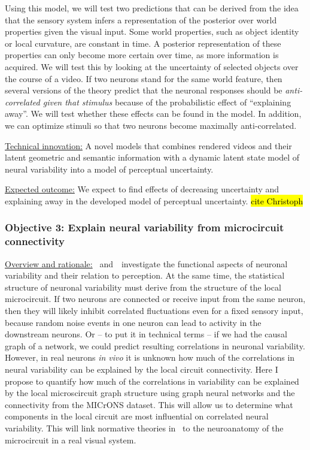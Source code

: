 \documentclass[COG,11pt]{ercgrant}
\begin{document}
Using this model, we will test two predictions that can be derived from the idea that the sensory system infers a representation of the posterior over world properties given the visual input.  Some world properties, such as object identity or local curvature, are constant in time. A posterior representation of these properties can only become more certain over time, as more information is acquired. We will test this by looking at the uncertainty of selected objects over the course of a video.  If two neurons stand for the same world feature, then several versions of the theory predict that the neuronal responses should be \textit{anti-correlated given that stimulus} because of the probabilistic effect of ``explaining away''. We will test whether these effects can be found in the model. In addition, we can optimize stimuli so that two neurons become maximally anti-correlated. 

\underline{Technical innovation:} A novel models that combines rendered videos and their latent geometric and semantic information with a dynamic latent state model of neural variability into a model of perceptual uncertainty.

\underline{Expected outcome:} We expect to find effects of decreasing uncertainty and explaining away in the developed model of perceptual uncertainty. \hl{cite Christoph}

\subsubsection{\colorbox{objiii}{\color{white}Objective 3}: Explain neural variability from microcircuit connectivity}
\label{sub:objiii}
\underline{Overview and rationale:} 
\obji~and~\objii~investigate the functional aspects of neuronal variability and their relation to perception. At the same time, the statistical structure of neuronal variability must derive from the structure of the local microcircuit. If two neurons are connected or receive input from the same neuron, then they will likely inhibit correlated fluctuations even for a fixed sensory input, because random noise events in one neuron can lead to activity in the downstream neurons. Or -- to put it in technical terms -- if we had the causal graph of a network, we could predict resulting correlations in neuronal variability. However, in real neurons \textit{in vivo} it is unknown how much of the correlations in neural variability can be explained by the local circuit connectivity. Here I propose to quantify how much of the correlations in variability can be explained by the local microscircuit graph structure using graph neural networks and the connectivity from the MICrONS dataset. This will allow us to determine what components in the local circuit are most influential on correlated neural variability. This will link normative theories in \objii~to the neuroanatomy of the microcircuit in a real visual system. 
\end{document}
